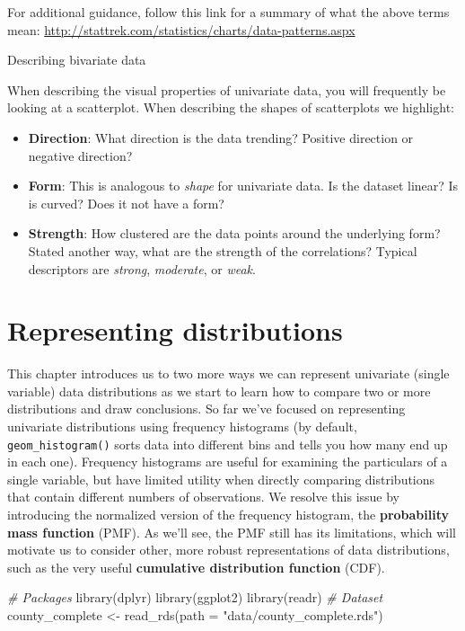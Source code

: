 \documentclass[
]{book}
\newenvironment{Shaded}{\begin{snugshade}}{\end{snugshade}}
\newcommand{\AttributeTok}[1]{\textcolor[rgb]{0.77,0.63,0.00}{#1}}
\newcommand{\CommentTok}[1]{\textcolor[rgb]{0.56,0.35,0.01}{\textit{#1}}}
\newcommand{\FunctionTok}[1]{\textcolor[rgb]{0.00,0.00,0.00}{#1}}
\newcommand{\NormalTok}[1]{#1}
\newcommand{\OtherTok}[1]{\textcolor[rgb]{0.56,0.35,0.01}{#1}}
\newcommand{\StringTok}[1]{\textcolor[rgb]{0.31,0.60,0.02}{#1}}
\begin{document}
For additional guidance, follow this link for a summary of what the above terms mean: \url{http://stattrek.com/statistics/charts/data-patterns.aspx}

{Describing bivariate data}

When describing the visual properties of univariate data, you will frequently be looking at a scatterplot.
When describing the shapes of scatterplots we highlight:

\begin{itemize}
\item
  \textbf{Direction}: What direction is the data trending?
  Positive direction or negative direction?
\item
  \textbf{Form}: This is analogous to \emph{shape} for univariate data.
  Is the dataset linear?
  Is is curved?
  Does it not have a form?
\item
  \textbf{Strength}: How clustered are the data points around the underlying form?
  Stated another way, what are the strength of the correlations?
  Typical descriptors are \emph{strong}, \emph{moderate}, or \emph{weak}.
\end{itemize}

\hypertarget{representing-distributions}{%
\chapter{Representing distributions}\label{representing-distributions}}

This chapter introduces us to two more ways we can represent univariate (single variable) data distributions as we start to learn how to compare two or more distributions and draw conclusions.
So far we've focused on representing univariate distributions using frequency histograms (by default, \texttt{geom\_histogram()} sorts data into different bins and tells you how many end up in each one).
Frequency histograms are useful for examining the particulars of a single variable, but have limited utility when directly comparing distributions that contain different numbers of observations.
We resolve this issue by introducing the normalized version of the frequency histogram, the \textbf{probability mass function} (PMF).
As we'll see, the PMF still has its limitations, which will motivate us to consider other, more robust representations of data distributions, such as the very useful \textbf{cumulative distribution function} (CDF).

\begin{Shaded}
\begin{Highlighting}[]
\CommentTok{\# Packages}
\FunctionTok{library}\NormalTok{(dplyr)}
\FunctionTok{library}\NormalTok{(ggplot2)}
\FunctionTok{library}\NormalTok{(readr)}
\CommentTok{\# Dataset}
\NormalTok{county\_complete }\OtherTok{\textless{}{-}} \FunctionTok{read\_rds}\NormalTok{(}\AttributeTok{path =} \StringTok{"data/county\_complete.rds"}\NormalTok{)}
\end{Highlighting}
\end{Shaded}
\end{document}
